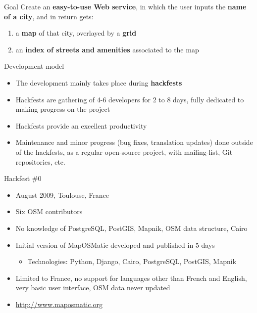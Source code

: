 \documentclass{beamer}
\begin{document}
\begin{frame}{Goal}
  \Large
  Create an {\bf easy-to-use Web service}, in which the user inputs
  the {\bf name of a city}, and in return gets:
  \begin{enumerate}
  \item a {\bf map} of that city, overlayed by a {\bf grid}
  \item an {\bf index of streets and amenities} associated to the map
  \end{enumerate}
\end{frame}

\begin{frame}{Development model}
  \begin{itemize}
  \item The development mainly takes place during {\bf hackfests}
  \item Hackfests are gathering of 4-6 developers for 2 to 8 days,
    fully dedicated to making progress on the project
  \item Hackfests provide an excellent productivity
  \item Maintenance and minor progress (bug fixes, translation
    updates) done outside of the hackfests, as a regular open-source
    project, with mailing-list, Git repositories, etc.
  \end{itemize}
\end{frame}

\begin{frame}{Hackfest \#0}
  \begin{itemize}
  \item August 2009, Toulouse, France
  \item Six OSM contributors
  \item No knowledge of PostgreSQL, PostGIS, Mapnik, OSM data
    structure, Cairo
  \item Initial version of MapOSMatic developed and published in 5 days
    \begin{itemize}
    \item Technologies: Python, Django, Cairo, PostgreSQL, PostGIS, Mapnik
    \end{itemize}
  \item Limited to France, no support for languages other than French
    and English, very basic user interface, OSM data never updated
  \item \url{http://www.maposmatic.org}
  \end{itemize}
\end{frame}
\end{document}
